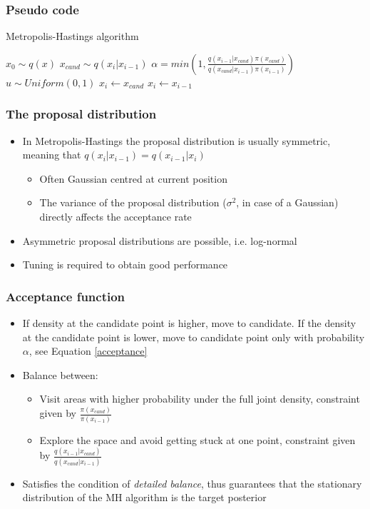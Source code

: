 \documentclass[11pt]{beamer}
\begin{document}
\begin{frame}
	\frametitle{Pseudo code}
	\begin{algorithm}[H]
		\caption{Metropolis-Hastings algorithm}
		\begin{algorithmic}[1]
		\small
		\State $x_{0} \sim q(x)$ 
			\State $x_{cand} \sim q(x_{i} | x_{i - 1})$ 
			\State $\alpha = min \left( 1, \frac{q(x_{i - 1} | x_{cand}) \pi(x_{cand})}{q(x_{cand} | x_{i - 1}) \pi(x_{i - 1})}  \right)$  \label{acceptance}
		\State $u \sim Uniform(0, 1)$
			\State $x_{i} \gets x_{cand}$ 
		\Else
			\State $x_{i} \gets x_{i - 1}$ 
		\EndIf
		\EndFor
	\EndProcedure
	\end{algorithmic}
	\end{algorithm}
\end{frame}


\begin{frame}
	\frametitle{The proposal distribution}
	\begin{itemize}
	\item In Metropolis-Hastings the proposal distribution is usually symmetric, meaning that $q(x_{i} |x_{i - 1}) = q(x_{i - 1} | x_{i})$
	\begin{itemize}
		\item Often Gaussian centred at current position
		\item The variance of the proposal distribution ($\sigma^{2}$, in case of a Gaussian) directly affects the acceptance rate
	\end{itemize}
	\item Asymmetric proposal distributions are possible, i.e. log-normal
	\item Tuning is required to obtain good performance
	\end{itemize}
\end{frame}


\begin{frame}
	\frametitle{Acceptance function}
	\begin{itemize}
	\item If density at the candidate point is higher, move to candidate. If the density at the candidate point is lower, move to candidate point only with probability $\alpha$, see Equation  \eqref{acceptance}
	\item Balance between:
	\begin{itemize}
		\item Visit areas with higher probability under the full joint density, constraint given by $\frac{\pi(x_{cand})}{\pi(x_{i - 1})}$
		\item Explore the space and avoid getting stuck at one point, constraint given by $\frac{q(x_{i - 1} | x_{cand})}{q(x_{cand} | x_{i - 1})}$
	\end{itemize}
	\item Satisfies the condition of \textit{detailed balance}, thus guarantees that the stationary distribution of the MH algorithm is the target posterior
	\end{itemize}
\end{frame}
\end{document}
